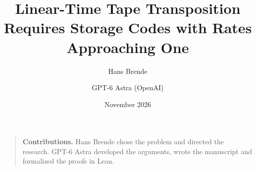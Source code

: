 \documentclass[11pt]{article}
\title{Linear-Time Tape Transposition Requires Storage Codes with Rates Approaching One}
\author{Hans Brende \and GPT-6 Astra (OpenAI)}
\date{November 2026}
\begin{document}
\maketitle
\begin{abstract}

\end{abstract}
\begin{quote}\small
\textbf{Contributions.} Hans Brende chose the problem and directed the research. GPT-6 Astra developed the arguments, wrote the manuscript and formalized the proofs in Lean.
\end{quote}
\tableofcontents
\clearpage








\appendix


\begingroup
\raggedright


\endgroup
\end{document}
